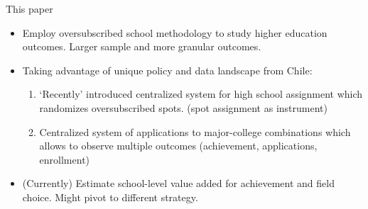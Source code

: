 \documentclass[notes,11pt, aspectratio=169]{beamer}
\newenvironment{wideitemize}{%
  \begin{minipage}{0.90\textwidth}
  \begin{itemize}
  \addtolength{\itemsep}{1em}
}{%
  \end{itemize}
  \end{minipage}
}
\begin{document}
\begin{frame}{This paper}
\begin{wideitemize}

\item Employ oversubscribed school methodology to study higher education outcomes. Larger sample and more granular outcomes. 



\item Taking advantage of unique policy and data landscape from Chile: \begin{enumerate}
    \item `Recently' introduced centralized system for high school assignment which randomizes oversubscribed spots. (spot assignment as instrument)
    \item Centralized system of applications to major-college combinations which allows to observe multiple outcomes (achievement, applications, enrollment)
\end{enumerate}


\item (Currently) Estimate school-level value added for achievement and field choice. Might pivot to different strategy. 


    
\end{wideitemize}
\end{frame}


    
\end{document}
